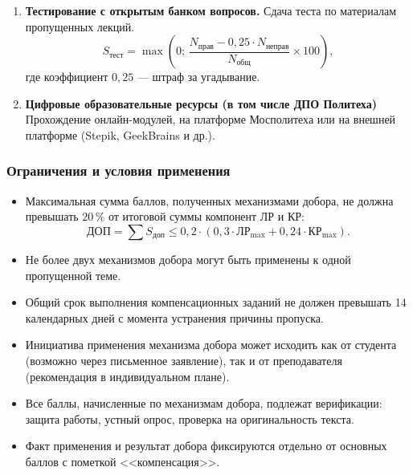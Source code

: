 \documentclass[10pt,a4paper]{article}
\begin{document}
\begin{enumerate}
        \item \textbf{Тестирование с открытым банком вопросов.} Сдача теста по материалам пропущенных лекций.
        \begin{equation}
            S_{\text{тест}} = \max\!\left(0;\, \frac{N_{\text{прав}} - 0,25 \cdot N_{\text{неправ}}}{N_{\text{общ}}} \times 100\right),
        \end{equation}
        где коэффициент $0,25$ --- штраф за угадывание.

        \item \textbf{Цифровые образовательные ресурсы (в том числе ДПО Политеха)}
        Прохождение онлайн-модулей, на платформе Мосполитеха или на внешней платформе (Stepik, GeekBrains и др.).
    \end{enumerate}

    \subsubsection{Ограничения и условия применения}

    \begin{itemize}
        \item Максимальная сумма баллов, полученных механизмами добора, не должна превышать $20\,\%$ от итоговой суммы компонент ЛР и КР:
        \begin{equation}
             \text{ДОП} = \sum S_{\text{доп}} \le 0,2 \cdot \left(0,3 \cdot \text{ЛР}_{\max} + 0,24 \cdot \text{КР}_{\max}\right).
        \end{equation}

        \item Не более двух механизмов добора могут быть применены к одной пропущенной теме.

        \item Общий срок выполнения компенсационных заданий не должен превышать 14 календарных дней с момента устранения причины пропуска.

        \item Инициатива применения механизма добора может исходить как от студента (возможно через письменное заявление), так и от преподавателя (рекомендация в индивидуальном плане).

        \item Все баллы, начисленные по механизмам добора, подлежат верификации: защита работы, устный опрос, проверка на оригинальность текста.

        \item Факт применения и результат добора фиксируются отдельно от основных баллов с пометкой <<компенсация>>.
    \end{itemize}
\end{document}

